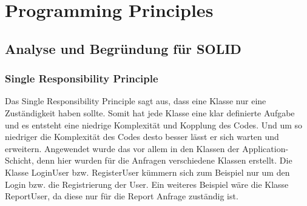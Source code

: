 


\chapter{Programming Principles}
\section{Analyse und Begründung für SOLID}

\subsection{Single Responsibility Principle}
Das Single Responsibility Principle sagt aus, dass eine Klasse nur eine Zuständigkeit haben sollte.
Somit hat jede Klasse eine klar definierte Aufgabe und es entsteht eine niedrige Komplexität und Kopplung des Codes.
Und um so niedriger die Komplexität des Codes desto besser lässt er sich warten und erweitern.
Angewendet wurde das vor allem in den Klassen der Application-Schicht, denn hier wurden für die Anfragen verschiedene Klassen erstellt.
Die Klasse LoginUser bzw. RegisterUser kümmern sich zum Beispiel nur um den Login bzw. die Registrierung der User.
Ein weiteres Beispiel wäre die Klasse ReportUser, da diese nur für die Report Anfrage zuständig ist.



